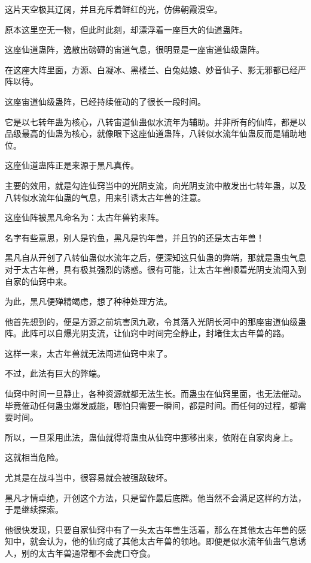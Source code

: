 
\begin{this_body}

这片天空极其辽阔，并且充斥着鲜红的光，仿佛朝霞漫空。

原本这里空无一物，但此时此刻，却漂浮着一座巨大的仙道蛊阵。

这座仙道蛊阵，逸散出磅礴的宙道气息，很明显是一座宙道仙级蛊阵。

在这座大阵里面，方源、白凝冰、黑楼兰、白兔姑娘、妙音仙子、影无邪都已经严阵以待。

这座宙道仙级蛊阵，已经持续催动的了很长一段时间。

它是以七转年蛊为核心，八转宙道仙蛊似水流年为辅助。并非所有的仙阵，都是以品级最高的仙蛊为核心，就像眼下这座仙道蛊阵，八转似水流年仙蛊反而是辅助地位。

这座仙道蛊阵正是来源于黑凡真传。

主要的效用，就是勾连仙窍当中的光阴支流，向光阴支流中散发出七转年蛊，以及八转似水流年仙蛊的气息，用来引诱太古年兽的注意。

这座仙阵被黑凡命名为：太古年兽钓来阵。

名字有些意思，别人是钓鱼，黑凡是钓年兽，并且钓的还是太古年兽！

黑凡自从开创了八转仙蛊似水流年之后，便深知这只仙蛊的弊端，那就是蛊虫气息对于太古年兽，具有极其强烈的诱惑。很有可能，让太古年兽顺着光阴支流闯入到自家的仙窍中来。

为此，黑凡便殚精竭虑，想了种种处理方法。

他首先想到的，便是方源之前坑害凤九歌，令其落入光阴长河中的那座宙道仙级蛊阵。此阵可以自爆光阴支流，让仙窍中时间完全静止，封堵住太古年兽的路。

这样一来，太古年兽就无法闯进仙窍中来了。

不过，此法有巨大的弊端。

仙窍中时间一旦静止，各种资源就都无法生长。而蛊虫在仙窍里面，也无法催动。毕竟催动任何蛊虫爆发威能，哪怕只需要一瞬间，都是时间。而任何的过程，都需要时间。

所以，一旦采用此法，蛊仙就得将蛊虫从仙窍中挪移出来，依附在自家肉身上。

这就相当危险。

尤其是在战斗当中，很容易就会被强敌破坏。

黑凡才情卓绝，开创这个方法，只是留作最后底牌。他当然不会满足这样的方法，于是继续探索。

他很快发现，只要自家仙窍中有了一头太古年兽生活着，那么在其他太古年兽的感知中，就会认为，他的仙窍成了其他太古年兽的领地。即便是似水流年仙蛊气息诱人，别的太古年兽通常都不会虎口夺食。


\end{this_body}
